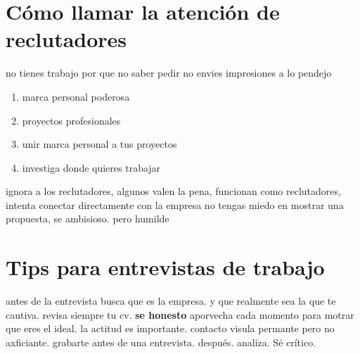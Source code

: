 \documentclass{article}
\begin{document}
    \section{Cómo llamar la atención de reclutadores}
    no tienes trabajo por que no saber pedir no envies impresiones a lo pendejo 
    \begin{enumerate}
        \item marca personal poderosa
        \item proyectos profesionales
        \item unir marca personal a tus proyectos
        \item investiga donde quieres trabajar
    \end{enumerate}
    ignora a los reclutadores, algunos valen la pena, funcionan como reclutadores, intenta conectar directamente con la empresa
    no tengas miedo en mostrar una propuesta, se ambisioso. pero humilde
    \section{Tips para entrevistas de trabajo}
    antes de la entrevista busca que es la empresa. y que realmente sea la que te cautiva.
    revisa siempre tu cv. \textbf{se honesto} aporvecha cada momento para motrar que eres el ideal.
    la actitud es importante. contacto visula permante pero no axficiante. grabarte antes de una entrevista.
     después. analiza. Sé crítico.
\end{document}
